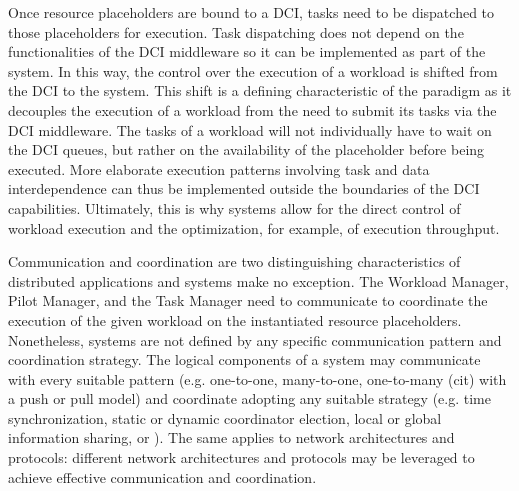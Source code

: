 \documentclass{sig-alternate}
\begin{document}
Once resource placeholders are bound to a DCI, tasks need to be dispatched to
those placeholders for execution. Task dispatching does not depend on the
functionalities of the DCI middleware so it can be implemented as part of the
\pilot system. In this way, the control over the execution of a workload is
shifted from the DCI to the \pilot system. This shift is a defining
characteristic of the \pilot paradigm    as it decouples the
execution of a workload from the need to submit its tasks via the DCI
middleware. The tasks of a workload will not individually have to wait on the
DCI queues, but rather on the availability of the placeholder before being
executed. More elaborate execution patterns involving task and data
interdependence can thus be implemented outside the boundaries of the DCI
capabilities. Ultimately, this is why \pilot systems allow for the direct
control of workload execution and the optimization, for example, of execution
throughput.  

Communication and coordination are two distinguishing characteristics of
distributed applications and \pilot systems make no exception. The Workload
Manager, Pilot Manager, and the Task Manager need to communicate to coordinate
the execution of the given workload on the instantiated resource placeholders.
Nonetheless, \pilot systems are not defined by any specific communication
pattern and coordination strategy. The logical components of a \pilot system
may communicate with every suitable pattern (e.g. one-to-one, many-to-one,
one-to-many (cit) with a push or pull model) and coordinate adopting any
suitable strategy (e.g. time synchronization, static or dynamic coordinator
election, local or global information sharing, or \MW). The same applies to
network architectures and protocols: different network architectures and
protocols may be leveraged to achieve effective communication and coordination.
\end{document}
